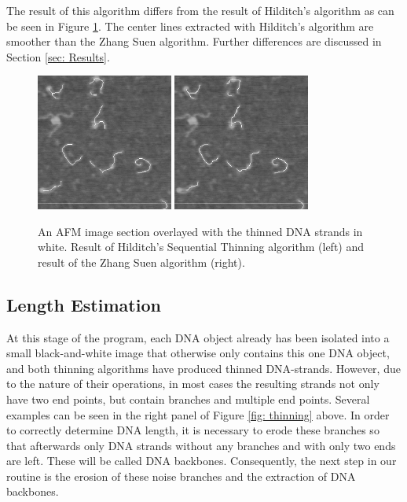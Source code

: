 \documentclass{article}
\begin{document}
The result of this algorithm differs from the result of Hilditch's algorithm as can be seen in Figure \ref{fig: thinnedHilditchZhang}. The center lines extracted with Hilditch's algorithm are smoother than the Zhang Suen algorithm. Further differences are discussed in Section \ref{sec: Results}.
\begin{figure}[htb!]
\centering
\includegraphics[width = 0.4\textwidth]{thinnedHilditch.png}
\includegraphics[width = 0.4\textwidth]{thinnedZhangSuen.png}
\caption{An AFM image section overlayed with the thinned DNA strands in white. Result of Hilditch's Sequential Thinning algorithm (left) and result of the Zhang Suen algorithm (right).}
\label{fig: thinnedHilditchZhang}
\end{figure}
\newpage

\subsection{Length Estimation}\label{sec:Length Estimation}
At this stage of the program, each DNA object already has been isolated into a small black-and-white image that otherwise only contains this one DNA object, and both thinning algorithms have produced thinned DNA-strands. However, due to the nature of their operations, in most cases the resulting strands not only have two end points, but contain branches and multiple end points. Several examples can be seen in the right panel of Figure \ref{fig: thinning} above. In order to correctly determine DNA length, it is necessary to erode these branches so that afterwards only DNA strands without any branches and with only two ends are left. These will be called DNA backbones. Consequently, the next step in our routine is the erosion of these noise branches and the extraction of DNA backbones. \\
\end{document}
